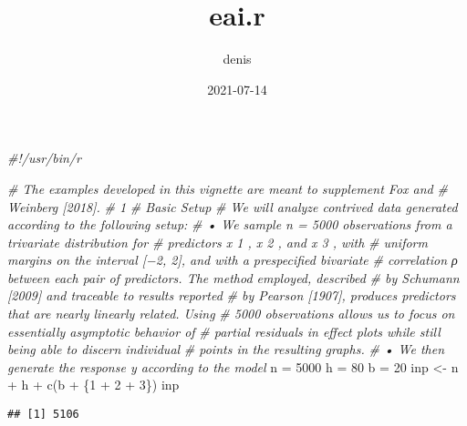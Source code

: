 \documentclass[
]{article}
\title{eai.r}
\author{denis}
\date{2021-07-14}
\newenvironment{Shaded}{\begin{snugshade}}{\end{snugshade}}
\newcommand{\CommentTok}[1]{\textcolor[rgb]{0.56,0.35,0.01}{\textit{#1}}}
\newcommand{\DecValTok}[1]{\textcolor[rgb]{0.00,0.00,0.81}{#1}}
\newcommand{\FunctionTok}[1]{\textcolor[rgb]{0.00,0.00,0.00}{#1}}
\newcommand{\NormalTok}[1]{#1}
\newcommand{\OtherTok}[1]{\textcolor[rgb]{0.56,0.35,0.01}{#1}}
\newcommand{\SpecialCharTok}[1]{\textcolor[rgb]{0.00,0.00,0.00}{#1}}
\begin{document}
\maketitle

\begin{Shaded}
\begin{Highlighting}[]
\CommentTok{\#!/usr/bin/r}

\CommentTok{\# The examples developed in this vignette are meant to supplement Fox and }
\CommentTok{\# Weinberg [2018].}
\CommentTok{\# 1}
\CommentTok{\# Basic Setup}
\CommentTok{\# We will analyze contrived data generated according to the following setup:}
\CommentTok{\#  • We sample n = 5000 observations from a trivariate distribution for }
\CommentTok{\# predictors x 1 , x 2 , and x 3 , with}
\CommentTok{\# uniform margins on the interval [−2, 2], and with a prespecified bivariate }
\CommentTok{\# correlation ρ between each pair of predictors. The method employed, described }
\CommentTok{\# by Schumann [2009] and traceable to results reported}
\CommentTok{\# by Pearson [1907], produces predictors that are nearly linearly related. Using }
\CommentTok{\# 5000 observations allows us to focus on essentially asymptotic behavior of }
\CommentTok{\# partial residuals in effect plots while still being able to discern individual }
\CommentTok{\# points in the resulting graphs.}
\CommentTok{\# • We then generate the response y according to the model}
\NormalTok{n }\OtherTok{=} \DecValTok{5000}
\NormalTok{h }\OtherTok{=} \DecValTok{80}
\NormalTok{b }\OtherTok{=} \DecValTok{20}
\NormalTok{inp }\OtherTok{\textless{}{-}}\NormalTok{ n }\SpecialCharTok{+}\NormalTok{ h }\SpecialCharTok{+} \FunctionTok{c}\NormalTok{(b }\SpecialCharTok{+}\NormalTok{ \{}\DecValTok{1} \SpecialCharTok{+} \DecValTok{2}  \SpecialCharTok{+} \DecValTok{3}\NormalTok{\})}
\NormalTok{inp}
\end{Highlighting}
\end{Shaded}

\begin{verbatim}
## [1] 5106
\end{verbatim}
\end{document}
